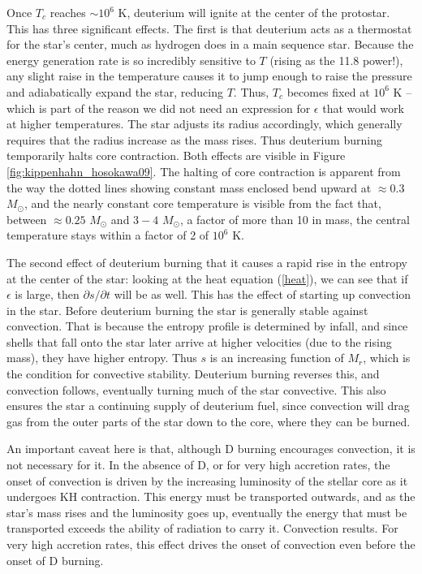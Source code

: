 Once $T_c$ reaches $\sim 10^6$ K, deuterium will ignite at the center of the protostar. This has three significant effects. The first is that deuterium acts as a thermostat for the star's center, much as hydrogen does in a main sequence star. Because the energy generation rate is so incredibly sensitive to $T$ (rising as the 11.8 power!), any slight raise in the temperature causes it to jump enough to raise the pressure and adiabatically expand the star, reducing $T$. Thus, $T_c$ becomes fixed at $10^6$ K -- which is part of the reason we did not need an expression for $\epsilon$ that would work at higher temperatures. The star adjusts its radius accordingly, which generally requires that the radius increase as the mass rises. Thus deuterium burning temporarily halts core contraction. Both effects are visible in Figure \ref{fig:kippenhahn_hosokawa09}. The halting of core contraction is apparent from the way the dotted lines showing constant mass enclosed bend upward at $\approx 0.3$ $M_\odot$, and the nearly constant core temperature is visible from the fact that, between $\approx 0.25$ $M_\odot$ and $3-4$ $M_\odot$, a factor of more than 10 in mass, the central temperature stays within a factor of 2 of $10^6$ K.

The second effect of deuterium burning that it causes a rapid rise in the entropy at the center of the star: looking at the heat equation (\ref{heat}), we can see that if $\epsilon$ is large, then $\partial s/\partial t$ will be as well. This has the effect of starting up convection in the star. Before deuterium burning the star is generally stable against convection. That is because the entropy profile is determined by infall, and since shells that fall onto the star later arrive at higher velocities (due to the rising mass), they have higher entropy. Thus $s$ is an increasing function of $M_r$, which is the condition for convective stability. Deuterium burning reverses this, and convection follows, eventually turning much of the star convective. This also ensures the star a continuing supply of deuterium fuel, since convection will drag gas from the outer parts of the star down to the core, where they can be burned.

An important caveat here is that, although D burning encourages convection, it is not necessary for it. In the absence of D, or for very high accretion rates, the onset of convection is driven by the increasing luminosity of the stellar core as it undergoes KH contraction. This energy must be transported outwards, and as the star's mass rises and the luminosity goes up, eventually the energy that must be transported exceeds the ability of radiation to carry it. Convection results. For very high accretion rates, this effect drives the onset of convection even before the onset of D burning.

